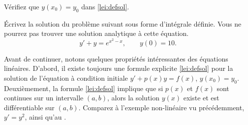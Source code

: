 \begin{exercise}
Vérifiez que $y(x_0) = y_0$ dans \eqref{lei:defsol}.
\end{exercise}

\begin{exercise}
Écrivez la solution du problème suivant sous forme d'intégrale définie.  Vous ne pourrez pas trouver une solution analytique à cette équation.
%
\begin{equation*}
y' + y = e^{x^2-x}, \qquad y(0) = 10 .
\end{equation*}
\end{exercise}

\begin{remark}\label{rem:regular}
Avant de continuer, notons quelques propriétés intéressantes des équations linéaires.  D'abord, il existe toujours une formule explicite \eqref{lei:defsol} pour la 
solution de l'équation à condition initiale 
$y' + p(x) y = f(x)$, $y(x_0) = y_0$.  Deuxièmement, la formule 
\eqref{lei:defsol} implique que si $p(x)$
et $f(x)$ sont continues sur un intervalle $(a,b)$, alors la solution 
$y(x)$ existe et est différentiable sur $(a,b)$.  Comparez à l'exemple non-linéaire vu précédemment, $y'=y^2$,
ainsi qu'au .
\end{remark}


